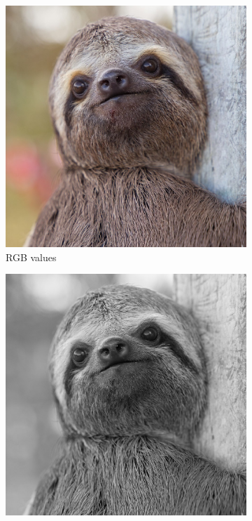 \begin{figure}[h]
    \centering
    \begin{subfigure}[b]{0.24\textwidth}
        \centering
        \includegraphics[width=\textwidth]{img/ch4/sloth.jpg}
        \caption{RGB \newline \centering values}
    \end{subfigure}
    \begin{subfigure}[b]{0.24\textwidth}
        \centering
        \includegraphics[width=\textwidth]{img/ch4/grayscale.png}

\end{subfigure}
\end{figure}

